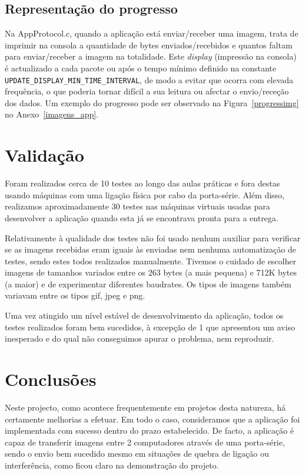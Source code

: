 \documentclass[11pt,a4paper,reqno]{report}
\numberwithin{equation}{section}
\begin{document}
\section{Representação do progresso}
Na AppProtocol.c, quando a aplicação está enviar/receber uma imagem, trata de imprimir na consola a quantidade de bytes enviados/recebidos e quantos faltam para enviar/receber a imagem na totalidade. Este \emph{display} (impressão na consola) é actualizado a cada pacote ou após o tempo mínimo definido na constante \verb|UPDATE_DISPLAY_MIN_TIME_INTERVAL|, de modo a evitar que ocorra com elevada frequência, o que poderia tornar difícil a sua leitura ou afectar o envio/receção dos dados. Um exemplo do progresso pode ser observado na Figura~\ref{progressimg} no Anexo~\ref{imagens_app}.

\chapter{Validação}

Foram realizados cerca de 10 testes ao longo das aulas práticas e fora destas usando máquinas com uma ligação física por cabo da porta-série. Além disso, realizamos aproximadamente 30 testes nas máquinas virtuais usadas para desenvolver a aplicação quando esta já se encontrava pronta para a entrega.

Relativamente à qualidade dos testes não foi usado nenhum auxiliar para verificar se as imagens recebidas eram iguais às enviadas nem nenhuma automatização de testes, sendo estes todos realizados manualmente. Tivemos o cuidado de escolher imagens de tamanhos variados entre os 263 bytes (a mais pequena) e 712K bytes (a maior) e de experimentar diferentes baudrates. Os tipos de imagens também variavam entre os tipos gif, jpeg e png.

Uma vez atingido um nível estável de desenvolvimento da aplicação, todos os testes realizados foram bem sucedidos, à excepção de 1 que apresentou um aviso inesperado e do qual não conseguimos apurar o problema, nem reproduzir.

\chapter{Conclusões}

Neste projecto, como acontece frequentemente em projetos desta natureza, há certamente melhorias a efetuar. Em todo o caso, consideramos que a aplicação foi implementada com sucesso dentro do prazo estabelecido. De facto, a aplicação é capaz de transferir imagens entre 2 computadores através de uma porta-série, sendo o envio bem sucedido mesmo em situações de quebra de ligação ou interferência, como ficou claro na demonstração do projeto.
\end{document}
